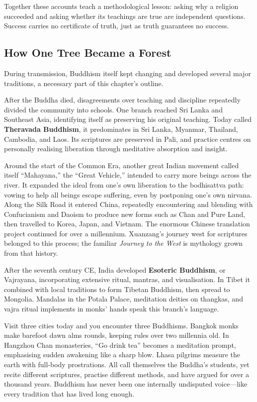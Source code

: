 Together these accounts teach a methodological lesson: asking why a religion succeeded and asking whether its teachings are true are independent questions. Success carries no certificate of truth, just as truth guarantees no success.

\subsection{How One Tree Became a Forest}
During transmission, Buddhism itself kept changing and developed several major traditions, a necessary part of this chapter's outline.

After the Buddha died, disagreements over teaching and discipline repeatedly divided the community into schools. One branch reached Sri Lanka and Southeast Asia, identifying itself as preserving his original teaching. Today called \textbf{Theravada Buddhism}, it predominates in Sri Lanka, Myanmar, Thailand, Cambodia, and Laos. Its scriptures are preserved in Pali, and practice centres on personally realising liberation through meditative absorption and insight.

Around the start of the Common Era, another great Indian movement called itself ``Mahayana,'' the ``Great Vehicle,'' intended to carry more beings across the river. It expanded the ideal from one's own liberation to the bodhisattva path: vowing to help all beings escape suffering, even by postponing one's own nirvana. Along the Silk Road it entered China, repeatedly encountering and blending with Confucianism and Daoism to produce new forms such as Chan and Pure Land, then travelled to Korea, Japan, and Vietnam. The enormous Chinese translation project continued for over a millennium. Xuanzang's journey west for scriptures belonged to this process; the familiar \textit{Journey to the West} is mythology grown from that history.

After the seventh century CE, India developed \textbf{Esoteric Buddhism}, or Vajrayana, incorporating extensive ritual, mantras, and visualisation. In Tibet it combined with local traditions to form Tibetan Buddhism, then spread to Mongolia. Mandalas in the Potala Palace, meditation deities on thangkas, and vajra ritual implements in monks' hands speak this branch's language.

Visit three cities today and you encounter three Buddhisms. Bangkok monks make barefoot dawn alms rounds, keeping rules over two millennia old. In Hangzhou Chan monasteries, ``Go drink tea'' becomes a meditation prompt, emphasising sudden awakening like a sharp blow. Lhasa pilgrims measure the earth with full-body prostrations. All call themselves the Buddha's students, yet recite different scriptures, practise different methods, and have argued for over a thousand years. Buddhism has never been one internally undisputed voice---like every tradition that has lived long enough.

